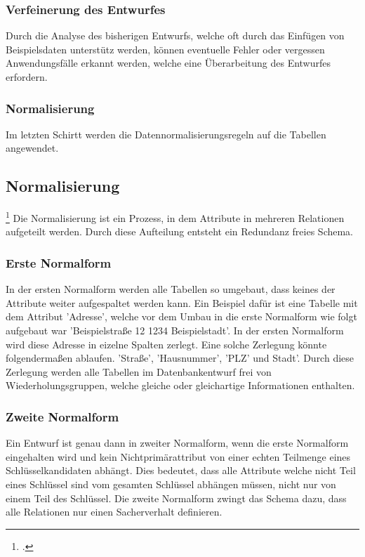 			\subsubsection{Verfeinerung des Entwurfes}
				Durch die Analyse des bisherigen Entwurfs, welche oft durch das Einfügen von Beispielsdaten unterstütz werden, können eventuelle Fehler oder vergessen Anwendungsfälle erkannt werden, welche eine Überarbeitung des Entwurfes erfordern. 
			\subsubsection{Normalisierung}
				Im letzten Schirtt werden die Datennormalisierungsregeln auf die Tabellen angewendet. 
		\subsection{Normalisierung}\footcite{normalisierung}
			Die Normalisierung ist ein Prozess, in dem Attribute in mehreren Relationen aufgeteilt werden. Durch diese Aufteilung entsteht ein Redundanz freies Schema.
			\subsubsection{Erste Normalform}
				In der ersten Normalform werden alle Tabellen so umgebaut, dass keines der Attribute weiter aufgespaltet werden kann. 
				Ein Beispiel dafür ist eine Tabelle mit dem Attribut 'Adresse', welche vor dem Umbau in die erste Normalform wie folgt aufgebaut war
				'Beispielstraße 12 1234 Beispielstadt'. In der ersten Normalform wird diese Adresse in eizelne Spalten zerlegt. 
				Eine solche Zerlegung könnte folgendermaßen ablaufen.
				'Straße', 'Hausnummer', 'PLZ' und Stadt'.
				Durch diese Zerlegung werden alle Tabellen im Datenbankentwurf frei von Wiederholungsgruppen, welche gleiche oder gleichartige Informationen enthalten.	
			\subsubsection{Zweite Normalform}
				Ein Entwurf ist genau dann in zweiter Normalform, wenn die erste Normalform eingehalten wird und kein Nichtprimärattribut von einer echten Teilmenge eines Schlüsselkandidaten abhängt.
				Dies bedeutet, dass alle Attribute welche nicht Teil eines Schlüssel sind vom gesamten Schlüssel abhängen müssen, nicht nur von einem Teil des Schlüssel. 
				Die zweite Normalform zwingt das Schema dazu, dass alle Relationen nur einen Sacherverhalt definieren.		
